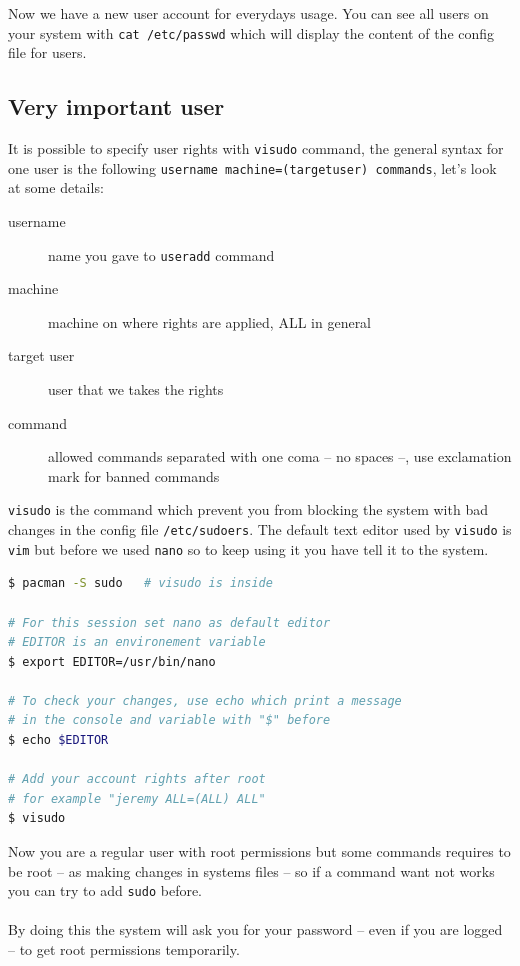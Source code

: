 Now we have a new user account for everydays usage. You can see all users on 
your system with \og{}\texttt{cat /etc/passwd}\fg{} which will display the 
content of the config file for users.

\subsection{Very important user}
It is possible to specify user rights with \texttt{visudo} command, the general syntax for one user is 
the following \og{}\texttt{username machine=(targetuser) commands}\fg{}, 
let's look at some details:

\begin{description}
\item[username] name you gave to \texttt{useradd} command
\item[machine] machine on where rights are applied, ALL in general
\item[target user] user that we takes the rights
\item[command] allowed commands separated with one coma -- no spaces --, 
use exclamation mark for banned commands
\end{description}

\texttt{visudo} is the command which prevent you from blocking the system with 
bad changes in the config file \texttt{/etc/sudoers}. The default text editor 
used by \texttt{visudo} is \texttt{vim} but before we used \texttt{nano} so to 
keep using it you have tell it to the system.
\newpage
\begin{lstlisting}[language=bash,caption=Specify user rights]
$ pacman -S sudo   # visudo is inside

# For this session set nano as default editor
# EDITOR is an environement variable
$ export EDITOR=/usr/bin/nano

# To check your changes, use echo which print a message
# in the console and variable with "$" before
$ echo $EDITOR

# Add your account rights after root
# for example "jeremy ALL=(ALL) ALL"
$ visudo
\end{lstlisting}

Now you are a regular user with root permissions but some commands requires
to be root  -- as making changes in systems files -- so if a command want not 
works you can try to add \texttt{sudo} before. 
\\\\
By doing this the system will ask 
you for your password -- even if you are logged -- to get root permissions 
temporarily.

